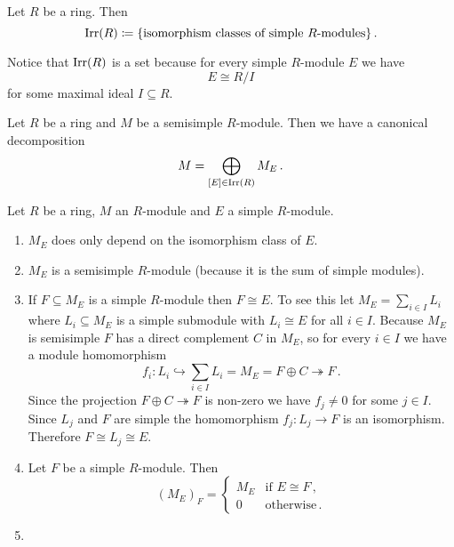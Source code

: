 \begin{definition}
  Let $R$ be a ring.
  Then
  \[
              \operatorname{Irr}(R)
    \coloneqq \{\text{isomorphism classes of simple $R$-modules}\} \,.
  \]
\end{definition}


Notice that $\operatorname{Irr}(R)$ is a set because for every simple $R$-module $E$ we have
\[
        E
  \cong R/I
\]
for some maximal ideal $I \subseteq R$.


\begin{corollary}\label{corollary: canonical decomposition semisimple module}
  Let $R$ be a ring and $M$ be a semisimple $R$-module.
  Then we have a canonical decomposition
  \[
      M
    = \bigoplus_{[E] \in \operatorname{Irr}(R)} M_E \,.
  \]
\end{corollary}


\begin{remark}
    Let $R$ be a ring, $M$ an $R$-module and $E$ a simple $R$-module.
  \begin{enumerate}[label=\emph{\alph*)},leftmargin=*]
    \item
      $M_E$ does only depend on the isomorphism class of $E$.
    \item
      $M_E$ is a semisimple $R$-module (because it is the sum of simple modules).
    \item
      If $F \subseteq M_E$ is a simple $R$-module then $F \cong E$.
      To see this let $M_E = \sum_{i \in I} L_i$ where $L_i \subseteq M_E$ is a simple submodule with $L_i \cong E$ for all $i \in I$.
      Because $M_E$ is semisimple $F$ has a direct complement $C$ in $M_E$, so for every $i \in I$ we have a module homomorphism
      \[
                            f_i
        \colon              L_i
        \hookrightarrow     \sum_{i \in I} L_i
        =                   M_E
        =                   F \oplus C
        \twoheadrightarrow  F \,.
      \]
      Since the projection $F \oplus C \twoheadrightarrow F$ is non-zero we have $f_j \neq 0$ for some $j \in I$.
      Since $L_j$ and $F$ are simple the homomorphism $f_j \colon L_j \to F$ is an isomorphism.
      Therefore $F \cong L_j \cong E$.
    \item
      Let $F$ be a simple $R$-module.
      Then
      \[
          (M_E)_F
        = \begin{cases}
            M_E & \text{if } E \cong F \,,  \\
              0 & \text{otherwise} \,.
          \end{cases}
      \]
    \item

\end{enumerate}
\end{remark}
